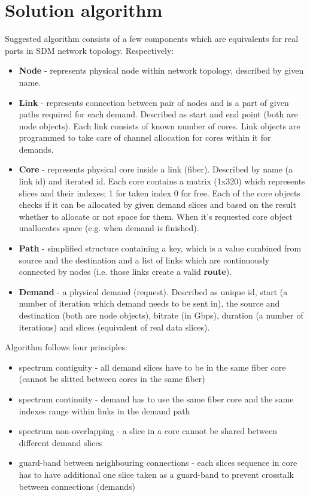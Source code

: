 \documentclass[conference]{IEEEtran}
\begin{document}
\section{Solution algorithm}
Suggested algorithm consists of a few components which are equivalents for real parts in SDM network topology. Respectively:
\begin{itemize}
\item \textbf{Node} - represents physical node within network topology, described by given name.
\item \textbf{Link} - represents connection between pair of nodes and is a part of given paths required for each demand. Described as start and end point (both are node objects). Each link consists of known number of cores. Link objects are programmed to take care of channel allocation for cores within it for demands.
\item \textbf{Core} - represents physical core inside a link (fiber). Described by name (a link id) and iterated id. Each core contains a matrix (1x320) which represents slices and their indexes; 1 for taken index 0 for free. Each of the core objects checks if it can be allocated by given demand slices and based on the result whether to allocate or not space for them. When it's requested core object unallocates space (e.g. when demand is finished).
\item \textbf{Path} - simplified structure containing a key, which is a value combined from source and the destination and a list of links which are continuously connected by nodes (i.e. those links create a valid \textbf{route}).
\item \textbf{Demand} - a physical demand (request). Described as unique id, start (a number of iteration which demand needs to be sent in), the source and destination (both are node objects), bitrate (in Gbps), duration (a number of iterations) and slices (equivalent of real data slices).
\end{itemize}
Algorithm follows four principles:
\begin{itemize}
\item spectrum contiguity - all demand slices have to be in the same fiber core (cannot be slitted between cores in the same fiber)
\item spectrum continuity - demand has to use the same fiber core and the same indexes range within links in the demand path
\item spectrum non-overlapping - a slice in a core cannot be shared between different demand slices
\item guard-band between neighbouring connections - each slices sequence in core has to have additional one slice taken as a guard-band to prevent crosstalk between connections (demands)
\end{itemize}
\end{document}

